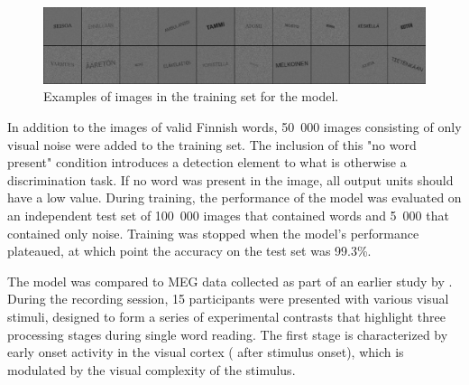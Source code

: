 \documentclass[a4paper, 10pt]{vanvliet_paper}
\begin{document}
\begin{figure}
    \includegraphics[width=\textwidth]{train.png}
    \caption{Examples of images in the training set for the model.}\label{fig:train}
\end{figure}

In addition to the images of valid Finnish words, 50~000 images consisting of only visual noise were added to the training set.
The inclusion of this "no word present" condition introduces a detection element to what is otherwise a discrimination task.
If no word was present in the image, all output units should have a low value.
During training, the performance of the model was evaluated on an independent test set of 100~000 images that contained words and 5~000 that contained only noise.
Training was stopped when the model's performance plateaued, at which point the accuracy on the test set was 99.3\%.

The model was compared to \gls{MEG} data collected as part of an earlier study by \textcite{Vartiainen2011}.
During the recording session, 15 participants were presented with various visual stimuli, designed to form a series of experimental contrasts that highlight three processing stages during single word reading.
The first stage is characterized by early onset activity in the visual cortex ( after stimulus onset), which is modulated by the visual complexity of the stimulus.
\end{document}
